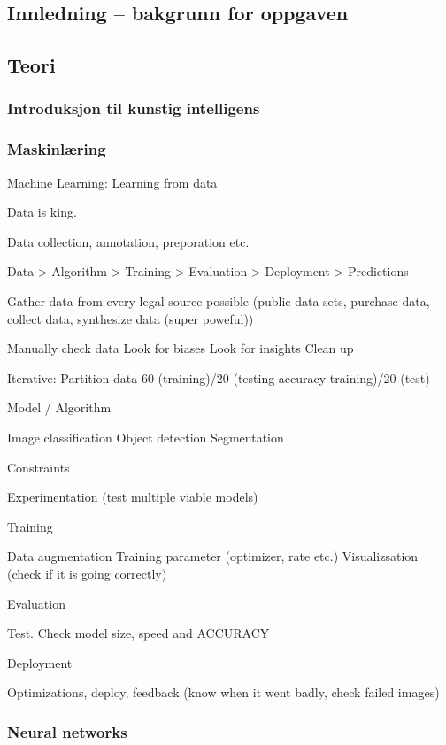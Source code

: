 \subsection{Innledning -- bakgrunn for oppgaven}
\subsection{Teori}
\subsubsection{Introduksjon til kunstig intelligens}

\subsubsection{Maskinlæring}

Machine Learning: Learning from data

Data is king.

Data collection, annotation, preporation etc.

Data > Algorithm > Training > Evaluation > Deployment > Predictions

	Gather data from every legal source possible (public data sets, purchase data, collect data, synthesize data (super poweful))

	Manually check data
	Look for biases
	Look for insights
	Clean up

	Iterative: Partition data 60 (training)/20 (testing accuracy training)/20 (test)

Model / Algorithm

	Image classification
	Object detection 
	Segmentation

	Constraints

	Experimentation (test multiple viable models)

Training

	Data augmentation
	Training parameter (optimizer, rate etc.)
	Visualizsation (check if it is going correctly)

Evaluation
	
	Test. Check model size, speed and ACCURACY

Deployment

	Optimizations, deploy, feedback (know when it went badly, check failed images)	

\subsubsection{Neural networks}

